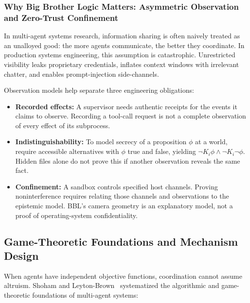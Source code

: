 \documentclass[11pt,a4paper]{article}
\begin{document}
\subsubsection{Why Big Brother Logic Matters: Asymmetric Observation and Zero-Trust Confinement}
\label{sec:why-bbl-matters}

In multi-agent systems research, information sharing is often naively treated as an unalloyed good: the more agents communicate, the better they coordinate. In production systems engineering, this assumption is catastrophic. Unrestricted visibility leaks proprietary credentials, inflates context windows with irrelevant chatter, and enables prompt-injection side-channels.

Observation models help separate three engineering obligations:
\begin{itemize}[leftmargin=1.8em,itemsep=2pt]
  \item \textbf{Recorded effects:} A supervisor needs authentic receipts for the events it claims to observe. Recording a tool-call request is not a complete observation of every effect of its subprocess.
  \item \textbf{Indistinguishability:} To model secrecy of a proposition $\phi$ at a world, require accessible alternatives with $\phi$ true and false, yielding $\neg K_i\phi\land\neg K_i\neg\phi$. Hidden files alone do not prove this if another observation reveals the same fact.
  \item \textbf{Confinement:} A sandbox controls specified host channels. Proving noninterference requires relating those channels and observations to the epistemic model. BBL's camera geometry is an explanatory model, not a proof of operating-system confidentiality.
\end{itemize}

\subsection{Game-Theoretic Foundations and Mechanism Design}

When agents have independent objective functions, coordination cannot assume altruism. Shoham and Leyton-Brown~ systematized the algorithmic and game-theoretic foundations of multi-agent systems:
\end{document}
